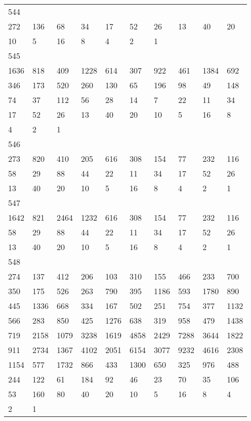 \begin{longtable}{*{10}{l}}
544&&&&&&&&&\\
272& 136& 68& 34& 17& 52& 26& 13& 40& 20\\
10& 5& 16& 8& 4& 2& 1& \\

545&&&&&&&&&\\
1636& 818& 409& 1228& 614& 307& 922& 461& 1384& 692\\
346& 173& 520& 260& 130& 65& 196& 98& 49& 148\\
74& 37& 112& 56& 28& 14& 7& 22& 11& 34\\
17& 52& 26& 13& 40& 20& 10& 5& 16& 8\\
4& 2& 1& \\

546&&&&&&&&&\\
273& 820& 410& 205& 616& 308& 154& 77& 232& 116\\
58& 29& 88& 44& 22& 11& 34& 17& 52& 26\\
13& 40& 20& 10& 5& 16& 8& 4& 2& 1\\

547&&&&&&&&&\\
1642& 821& 2464& 1232& 616& 308& 154& 77& 232& 116\\
58& 29& 88& 44& 22& 11& 34& 17& 52& 26\\
13& 40& 20& 10& 5& 16& 8& 4& 2& 1\\

548&&&&&&&&&\\
274& 137& 412& 206& 103& 310& 155& 466& 233& 700\\
350& 175& 526& 263& 790& 395& 1186& 593& 1780& 890\\
445& 1336& 668& 334& 167& 502& 251& 754& 377& 1132\\
566& 283& 850& 425& 1276& 638& 319& 958& 479& 1438\\
719& 2158& 1079& 3238& 1619& 4858& 2429& 7288& 3644& 1822\\
911& 2734& 1367& 4102& 2051& 6154& 3077& 9232& 4616& 2308\\
1154& 577& 1732& 866& 433& 1300& 650& 325& 976& 488\\
244& 122& 61& 184& 92& 46& 23& 70& 35& 106\\
53& 160& 80& 40& 20& 10& 5& 16& 8& 4\\
2& 1& \\


\end{longtable}
